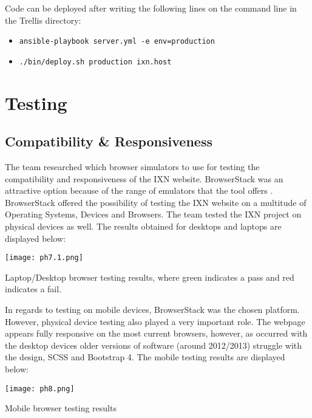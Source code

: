 \documentclass[fontsize=11pt]{extarticle}
\numberwithin{figure}{section} %
\providecommand{\tightlist}{%
  \setlength{\itemsep}{0pt}\setlength{\parskip}{0pt}}
\begin{document}
Code can be deployed after writing the following lines on the command
line in the Trellis directory:

\begin{itemize}
\tightlist
\item
  \texttt{ansible-playbook\ server.yml\ -e\ env=production}
\item
  \texttt{./bin/deploy.sh\ production\ ixn.host}
\end{itemize}

\newpage

\hypertarget{testing}{%
\section{Testing}\label{testing}}

\hypertarget{compatibility-responsiveness}{%
\subsection{Compatibility \&
Responsiveness}\label{compatibility-responsiveness}}

The team researched which browser simulators to use for testing the
compatibility and responsiveness of the IXN website. BrowserStack was an
attractive option because of the range of emulators that the tool offers
\cite{g6}. BrowserStack offered the possibility of testing the IXN
website on a multitude of Operating Systems, Devices and Browsers. The
team tested the IXN project on physical devices as well. The results
obtained for desktops and laptops are displayed below:

\begin{table}[H]
      \centering
      \texttt{[image: ph7.1.png]}
      \caption{Laptop/Desktop browser testing results, where green indicates a pass and red indicates a fail.}
 \end{table}

In regards to testing on mobile devices, BrowserStack was the chosen
platform. However, physical device testing also played a very important
role. The webpage appears fully responsive on the most current browsers,
however, as occurred with the desktop devices older versions of software
(around 2012/2013) struggle with the design, SCSS and Bootstrap 4. The
mobile testing results are displayed below:

\begin{table}[H]
      \centering
      \texttt{[image: ph8.png]}
      \caption{Mobile browser testing results}
 \end{table}
\end{document}
